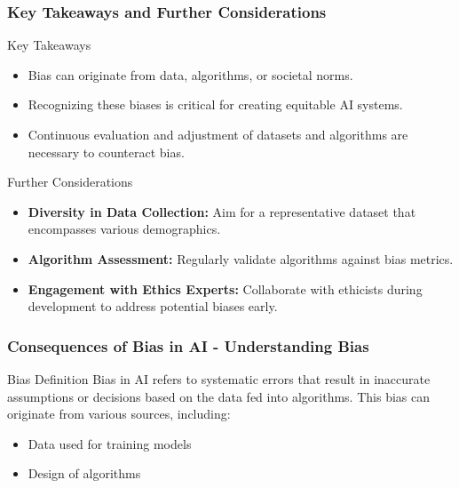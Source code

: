 \documentclass[aspectratio=169]{beamer}
\begin{document}
\begin{frame}[fragile]
    \frametitle{Key Takeaways and Further Considerations}
    
    \begin{block}{Key Takeaways}
        \begin{itemize}
            \item Bias can originate from data, algorithms, or societal norms.
            \item Recognizing these biases is critical for creating equitable AI systems.
            \item Continuous evaluation and adjustment of datasets and algorithms are necessary to counteract bias.
        \end{itemize}
    \end{block}
    
    \begin{block}{Further Considerations}
        \begin{itemize}
            \item \textbf{Diversity in Data Collection:} Aim for a representative dataset that encompasses various demographics.
            \item \textbf{Algorithm Assessment:} Regularly validate algorithms against bias metrics.
            \item \textbf{Engagement with Ethics Experts:} Collaborate with ethicists during development to address potential biases early.
        \end{itemize}
    \end{block}
\end{frame}

\begin{frame}[fragile]
    \frametitle{Consequences of Bias in AI - Understanding Bias}
    \begin{block}{Bias Definition}
        Bias in AI refers to systematic errors that result in inaccurate assumptions or decisions based on the data fed into algorithms. 
        This bias can originate from various sources, including:
        \begin{itemize}
            \item Data used for training models
            \item Design of algorithms
        \end{itemize}
    \end{block}
\end{frame}
\end{document}
